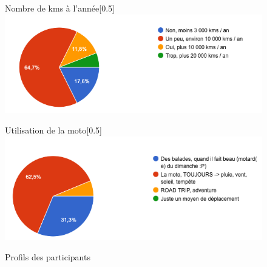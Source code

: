 \begin{figure}[H]
  \begin{subcaptionbox}{Nombre de kms à l'année}[0.5\linewidth]
    {\includegraphics[width=\linewidth]{coeur_memoire/graphique/nb_km_an.png}}
  \end{subcaptionbox}
  \hfill
  \begin{subcaptionbox}{Utilisation de la moto}[0.5\linewidth]
    {\includegraphics[width=\linewidth]{coeur_memoire/graphique/utilisation_moto.png}}
  \end{subcaptionbox}
  \caption{Profils des participants}
\end{figure}

